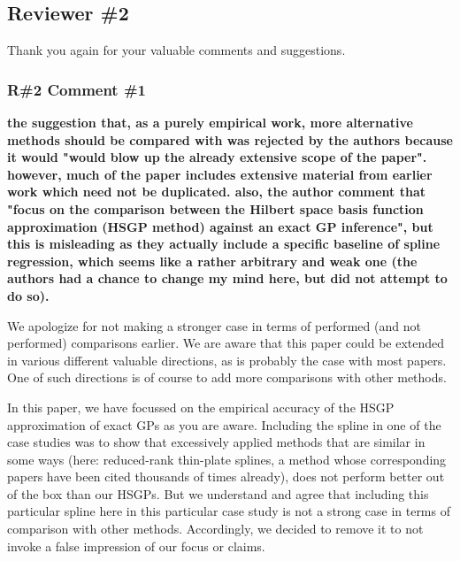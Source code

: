 \documentclass[11pt]{report}
\begin{document}

\subsection*{Reviewer \#2}


Thank you again for your valuable comments and suggestions.


\subsubsection*{R\#2 Comment \#1}

\textbf{the suggestion that, as a purely empirical work, more alternative methods should be compared with was rejected by the authors because it would "would blow up the already extensive scope of the paper". however, much of the paper includes extensive material from earlier work which need not be duplicated. also, the author comment that "focus on the comparison between the Hilbert space basis function approximation (HSGP method) against an exact GP inference", but this is misleading as they actually include a specific baseline of spline regression, which seems like a rather arbitrary and weak one (the authors had a chance to change my mind here, but did not attempt to do so).}

We apologize for not making a stronger case in terms of performed (and not performed) comparisons earlier. We are aware that this paper could be extended in various different valuable directions, as is probably the case with most papers. One of such directions is of course to add more comparisons with other methods. 

In this paper, we have focussed on the empirical accuracy of the HSGP approximation of exact GPs as you are aware. Including the spline in one of the case studies was to show that excessively applied methods that are similar in some ways (here: reduced-rank thin-plate splines, a method whose corresponding papers have been cited thousands of times already), does not perform better out of the box than our HSGPs. But we understand and agree that including this particular spline here in this particular case study is not a strong case in terms of comparison with other methods. Accordingly, we decided to remove it to not invoke a false impression of our focus or claims. 
\end{document}
